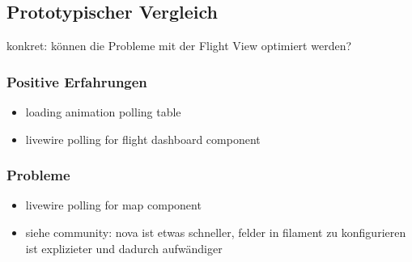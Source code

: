 \subsection{Prototypischer Vergleich}
konkret: können die Probleme mit der Flight View optimiert werden?

\subsubsection{Positive Erfahrungen}
\begin{itemize}
    \item loading animation polling table
    \item livewire polling for flight dashboard component
\end{itemize}

\subsubsection{Probleme}
\begin{itemize}
    \item livewire polling for map component
    \item siehe community: nova ist etwas schneller, felder in filament zu konfigurieren ist explizieter und dadurch aufwändiger
\end{itemize}
